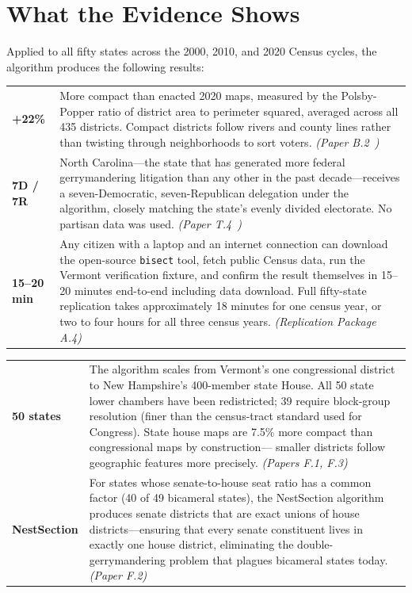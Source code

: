 
\section{What the Evidence Shows}

Applied to all fifty states across the 2000, 2010, and 2020 Census cycles,
the algorithm produces the following results:

\bigskip

\noindent
\begin{tabular}{@{}>{\bfseries\large}p{} p{}@{}}
+22\% &
More compact than enacted 2020 maps, measured by the Polsby-Popper
ratio of district area to perimeter squared, averaged across all 435 districts.
Compact districts follow rivers and county lines rather than
twisting through neighborhoods to sort voters.
\textit{(Paper B.2~\cite{dellaLibera2026edgeWeighted})}\\[10pt]

7D / 7R &
North Carolina---the state that has generated more federal gerrymandering
litigation than any other in the past decade---receives a
seven-Democratic, seven-Republican delegation under the algorithm,
closely matching the state's evenly divided electorate.
No partisan data was used.
\textit{(Paper T.4~\cite{dellaLibera2026ncRegions})}\\[10pt]

15--20 min &
Any citizen with a laptop and an internet connection can download
the open-source \texttt{bisect} tool, fetch public Census data,
run the Vermont verification fixture, and confirm the result themselves
in 15--20 minutes end-to-end including data download.
Full fifty-state replication takes approximately 18 minutes for one
census year, or two to four hours for all three census years.
\textit{(Replication Package A.4)}\\
\end{tabular}

\bigskip

\bigskip

\noindent
\begin{tabular}{@{}>{\bfseries\large}p{} p{}@{}}
50 states &
The algorithm scales from Vermont's one congressional district to New Hampshire's
400-member state House.
All 50 state lower chambers have been redistricted; 39 require block-group
resolution (finer than the census-tract standard used for Congress).
State house maps are 7.5\% more compact than congressional maps by construction---
smaller districts follow geographic features more precisely.
\textit{(Papers F.1, F.3)}\\[10pt]

NestSection &
For states whose senate-to-house seat ratio has a common factor (40 of 49
bicameral states), the NestSection algorithm produces senate districts
that are exact unions of house districts---ensuring that every senate
constituent lives in exactly one house district, eliminating the
double-gerrymandering problem that plagues bicameral states today.
\textit{(Paper F.2)}\\
\end{tabular}

